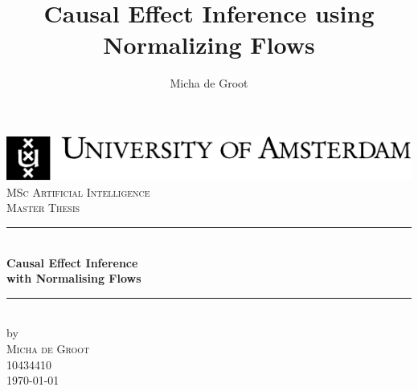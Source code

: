 \documentclass{report}
\title{Causal Effect Inference using Normalizing Flows}
\author{Micha de Groot}
\newcommand{\red}[1]{{\color{red}{#1}}}
\begin{document}
\begin{titlepage}

\newcommand{\HRule}{\rule{\linewidth}{0.5mm}} %
\center %
 

\includegraphics[width=\linewidth]{latex/Images/uvaENG.pdf}\\[2.5cm]
\textsc{\Large MSc Artificial Intelligence}\\[0.2cm]
\textsc{\Large Master Thesis}\\[0.5cm] 


\HRule \\[0.4cm]
{ \huge \bfseries Causal Effect Inference\\ with Normalising Flows}\\[0.4cm] %
\HRule \\[0.5cm]
 

by\\[0.2cm]
\textsc{\Large Micha de Groot}\\[0.2cm] %
10434410\\[1cm]



{\Large \today}\\[1cm] %


\end{titlepage}
\end{document}
